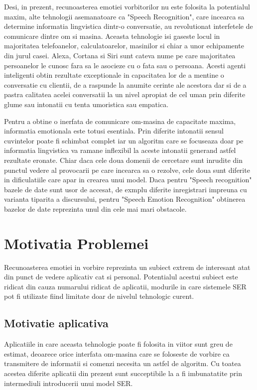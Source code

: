 \documentclass[a4paper,12pt, twoside]{book}
\begin{document}
				Desi, in prezent, recunoasterea emotiei vorbitorilor nu este folosita la potentialul maxim, alte tehnologii asemanatoare ca "Speech Recognition", care incearca sa determine informatia lingvistica dintr-o conversatie, au revolutionat interfetele de comunicare dintre om si masina. Aceasta tehnologie isi gaseste locul in majoritatea telefoanelor, calculatoarelor, masinilor si chiar a unor echipamente din jurul casei. Alexa, Cortana si Siri sunt cateva nume pe care majoritatea persoanelor le cunosc fara sa le asocieze cu o fata sau o persoana. Acesti agenti inteligenti obtin rezultate exceptionale in capacitatea lor de a mentine o conversatie cu clientii, de a raspunde la anumite cerinte ale acestora dar si de a pastra calitatea acelei conversatii la un nivel apropiat de cel uman prin diferite glume sau intonatii cu tenta umoristica sau empatica. \par				
				Pentru a obtine o inerfata de comunicare om-masina de capacitate maxima, informatia emotionala este totusi esentiala. Prin diferite intonatii sensul cuvintelor poate fi schimbat complet iar un algoritm care se focuseaza doar pe informatia lingvistica va ramane inflexibil la aceste intonatii generand astfel rezultate eronate. Chiar daca cele doua domenii de cercetare sunt inrudite din punctul vedere al provocarii pe care incearca sa o rezolve, cele doua sunt diferite in dificulatiile care apar in crearea unui model. Daca pentru "Speech recognition" bazele de date sunt usor de accesat, de exmplu diferite inregistrari impreuna cu varianta tiparita a discursului, pentru "Speech Emotion Recognition" obtinerea bazelor de date reprezinta unul din cele mai mari obstacole.\par
					

		\section{Motivatia Problemei}
			Recunoasterea emotiei in vorbire reprezinta un subiect extrem de interesant atat din punct de vedere aplicativ cat si personal. Potentialul acestui subiect este ridicat din cauza numarului ridicat de aplicatii, modurile in care sistemele SER pot fi utilizate fiind limitate doar de nivelul tehnologic curent.
			\subsection{Motivatie aplicativa}				
					Aplicatiile in care aceasta tehnologie poate fi folosita in viitor sunt greu de estimat, deoarece orice interfata om-masina care se foloseste de vorbire ca transmitere de informatii si comenzi necesita un astfel de algoritm. Cu toatea acestea diferite aplicatii din prezent sunt succeptibile la a fi imbunatatite prin intermediuli introducerii unui model SER. \par
					
\end{document}
